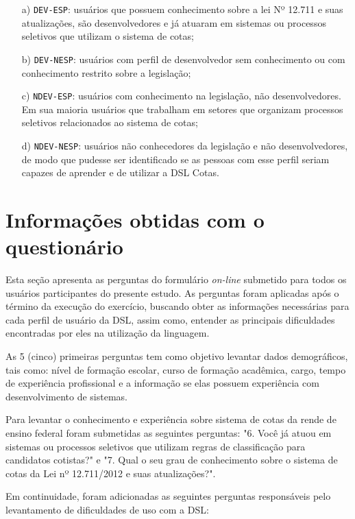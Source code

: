 \begin{enumerate}
    \item[a)] \texttt{DEV-ESP}: usuários que possuem conhecimento sobre a lei Nº 12.711 e suas atualizações, são desenvolvedores e já atuaram em sistemas ou processos seletivos que utilizam o sistema de cotas;
    \item[b)] \texttt{DEV-NESP}: usuários com perfil de desenvolvedor sem conhecimento ou com conhecimento restrito sobre a legislação;
    \item[c)] \texttt{NDEV-ESP}: usuários com conhecimento na legislação, não desenvolvedores. Em sua maioria usuários que trabalham em setores que organizam processos seletivos relacionados ao sistema de cotas;
    \item[d)] \texttt{NDEV-NESP}: usuários não conhecedores da legislação e não desenvolvedores, de modo que pudesse ser identificado se as pessoas com esse perfil seriam capazes de aprender e de utilizar a DSL Cotas.
\end{enumerate}

\section{Informações obtidas com o questionário}
\label{sec:perguntasaplicadas}

Esta seção apresenta as perguntas do formulário \textit{on-line} submetido para todos os usuários participantes do presente estudo. As perguntas foram aplicadas após o término da execução do exercício, buscando obter as informações necessárias para cada perfil de usuário da DSL, assim como, entender as principais dificuldades encontradas por eles na utilização da linguagem.

As 5 (cinco) primeiras perguntas tem como objetivo levantar dados demográficos, tais como: nível de formação escolar, curso de formação acadêmica, cargo, tempo de experiência profissional e a informação se elas possuem experiência com desenvolvimento de sistemas.

Para levantar o conhecimento e experiência sobre sistema de cotas da rende de ensino federal foram submetidas as seguintes perguntas: "6. Você já atuou em sistemas ou processos seletivos que utilizam regras de classificação para candidatos cotistas?" e "7. Qual o seu grau de conhecimento sobre o sistema de cotas da Lei nº 12.711/2012 e suas atualizações?".

Em continuidade, foram adicionadas as seguintes perguntas responsáveis pelo levantamento de dificuldades de uso com a DSL:

